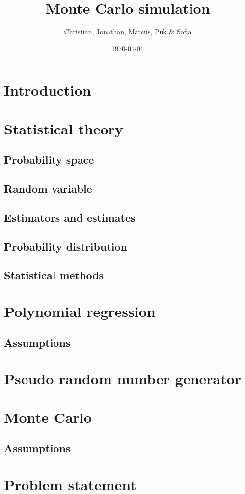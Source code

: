 \documentclass{article}
\title{Monte Carlo simulation}
\author{Christian, Jonathan, Marcus, Puk & Sofia}
\date{\today}
\begin{document}
	\maketitle
	\newpage
	\tableofcontents
	\newpage
	\section{Introduction}
	\newpage
	\section{Statistical theory}
	\subsection{Probability space}
	\subsection{Random variable}
	\subsection{Estimators and estimates}
	\subsection{Probability distribution}
	\subsection{Statistical methods}
	\newpage
	\section{Polynomial regression}
	\subsection{Assumptions}
	\newpage
	\section{Pseudo random number generator}
	\newpage
	\section{Monte Carlo}
	\subsection{Assumptions}
	\newpage
	\section{Problem statement}
	\newpage
\end{document}
